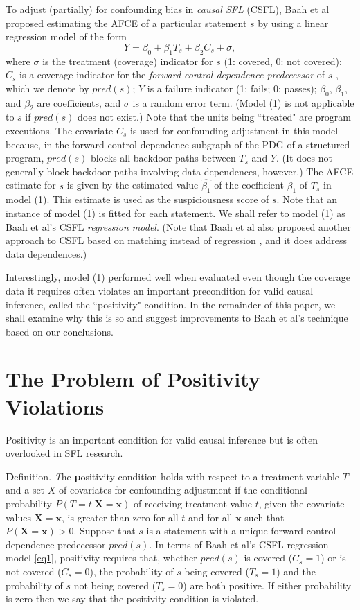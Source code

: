 To adjust (partially) for confounding bias in {\it causal SFL} (CSFL), Baah et al proposed estimating the AFCE of a particular statement $s$ by using a linear regression model of the form
\begin{equation}\label{eq1}
Y=\beta_0+\beta_1T_s+\beta_2C_s+\sigma,
\end{equation}
where $\sigma$ is the treatment (coverage) indicator for $s$ (1: covered, 0: not covered); $C_s$ is a coverage indicator for the {\it forward control dependence predecessor} of $s$ \cite{ball1993s}, which we denote by $pred(s)$; $Y$ is a failure indicator (1: fails; 0: passes); $\beta_0$, $\beta_1$, and $\beta_2$ are coefficients, and $\sigma$ is a random error term.  (Model (1) is not applicable to $s$ if $pred(s)$ does not exist.)  Note that the units being ``treated" are program executions.  The covariate $C_s$ is used for confounding adjustment in this model because, in the forward control dependence subgraph of the PDG of a structured program, $pred(s)$ blocks all backdoor paths between $T_s$ and $Y$.  (It does not generally block backdoor paths involving data dependences, however.)  The AFCE estimate for $s$ is given by the estimated value $\widehat{\beta_1}$ of the coefficient $\beta_1$ of $T_s$ in model (1).  This estimate is used as the suspiciousness score of $s$.  Note that an instance of model (1) is fitted for each statement.  We shall refer to model (1) as Baah et al’s CSFL {\it regression model}.  (Note that Baah et al also proposed another approach to CSFL based on matching instead of regression \cite{baah2011mitigating}, and it does address data dependences.)

Interestingly, model (1) performed well when evaluated \cite{baah2010causal} even though the coverage data it requires often violates an important precondition for valid causal inference, called the ``positivity" condition.  In the remainder of this paper, we shall examine why this is so and suggest improvements to Baah et al’s technique based on our conclusions.

\section{The Problem of Positivity Violations}\label{sec2}
Positivity \cite{hernan2006estimating} is an important condition for valid causal inference but is often overlooked in SFL research.

{\textbf Definition.}  {\textit The {\textbf positivity} condition  holds with respect to a treatment variable $T$ and a set $X$ of covariates for confounding adjustment if the conditional probability $P(T=t|\mathbf{X=x})$ of receiving treatment value $t$, given the covariate values $\mathbf{X=x}$, is greater than zero for all $t$ and for all $\mathbf{x}$ such that $P(\mathbf{X=x})>0$.}
Suppose that $s$ is a statement with a unique forward control dependence predecessor $pred(s)$.  In terms of Baah et al's CSFL regression model \eqref{eq1}, positivity requires that, whether $pred(s)$ is covered ($C_s=1$) or is not covered ($C_s=0$), the probability of $s$ being covered ($T_s=1$) and the probability of $s$ not being covered ($T_s=0$) are both positive.  If either probability is zero then we say that the positivity condition is violated.

